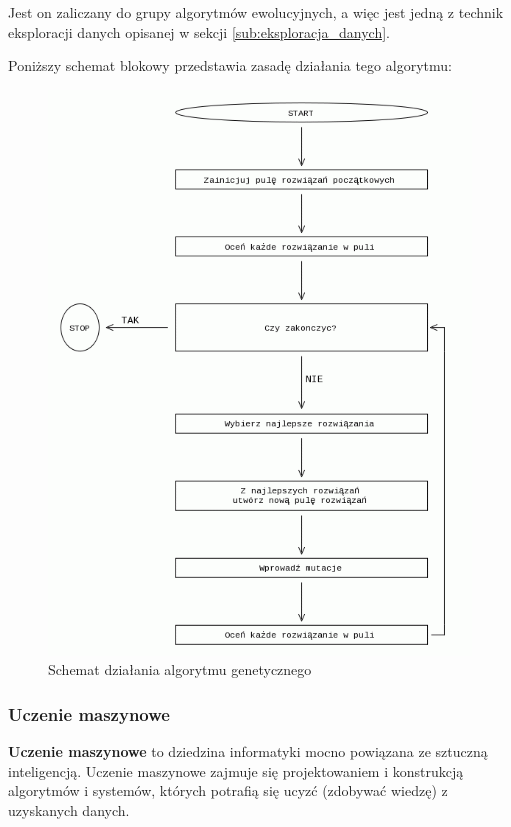 Jest on zaliczany do grupy algorytmów ewolucyjnych, a więc jest jedną z technik eksploracji danych opisanej w sekcji \ref{sub:eksploracja_danych}.

Poniższy schemat blokowy przedstawia zasadę działania tego algorytmu:
\begin{figure}[h]
\centerline{\includegraphics[scale=0.5]{obrazki/algorytm_genetyczny.png}}
\caption{Schemat działania algorytmu genetycznego}
\label{fig:alg_gen}
\end{figure}

\subsubsection{Uczenie maszynowe}
\label{sub:uczenie_maszynowe}
\textbf{Uczenie maszynowe} to dziedzina informatyki mocno powiązana ze sztuczną inteligencją. Uczenie maszynowe zajmuje się projektowaniem i konstrukcją algorytmów i systemów, których potrafią się ucyzć (zdobywać wiedzę) z uzyskanych danych.

